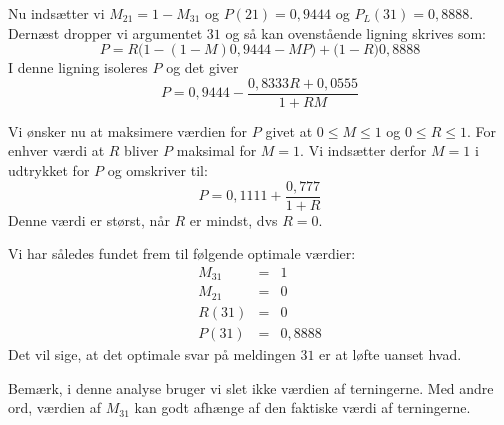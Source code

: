\documentclass[12pt,oneside,a4paper]{article}
\newcommand{\bas}{\begin{eqnarray*}}
\newcommand{\eas}{\end{eqnarray*}}
\begin{document}
Nu indsætter vi $M_{21} = 1-M_{31}$ og $P(21) = 0,9444$ og $P_L(31) = 0,8888$. Dernæst
dropper vi argumentet $31$ og så kan ovenstående ligning skrives som:
$$
P = R\big(1-(1-M)0,9444-MP\big) + \big(1-R\big)0,8888
$$
I denne ligning isoleres $P$ og det giver
$$
P = 0,9444 - \frac{0,8333 R + 0,0555}{1+RM}
$$

Vi ønsker nu at maksimere værdien for $P$ givet at $0\le M \le1$ og $0\le R\le 1$.
For enhver værdi at $R$ bliver $P$ maksimal for $M=1$. Vi indsætter derfor $M=1$ i udtrykket for
$P$ og omskriver til:
$$
P = 0,1111 + \frac{0,777}{1+R}
$$
Denne værdi er størst, når $R$ er mindst, dvs $R=0$.

Vi har således fundet frem til følgende optimale værdier:
\bas
M_{31} &=& 1 \\
M_{21} &=& 0 \\
R(31) &=& 0 \\
P(31) &=& 0,8888
\eas
Det vil sige, at det optimale svar på meldingen $31$ er at løfte uanset hvad.

Bemærk, i denne analyse bruger vi slet ikke værdien af terningerne. 
Med andre ord, værdien af $M_{31}$ kan godt afhænge af den faktiske værdi af terningerne.
\end{document}
